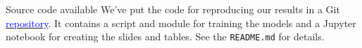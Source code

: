 \documentclass[]{beamer}
\begin{document}
\begin{frame}{Source code available}
We've put the code for reproducing our results in a Git \href{https://source-americas.it.here.com/projects/1614-had-sensing-and-perception-team/repositories/6722/source/master/upsampling}{\textcolor{blue}{repository}}.  It contains a script and module for training the models and a Jupyter notebook for creating the slides and tables. See the \texttt{README.md} for details.
\end{frame}
\end{document}
